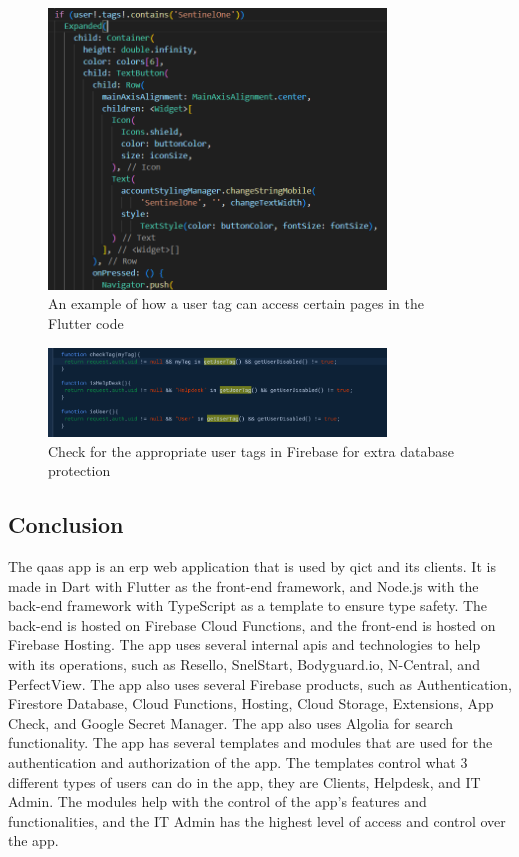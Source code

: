 \begin{figure}[htbp]
      \centering
      \includegraphics[width=0.8\textwidth]{Figures/Qaas App/User tags.png}
      \caption{An example of how a user tag can access certain pages in the Flutter code}
\end{figure}

\begin{figure}[htbp]
      \centering
      \includegraphics[width=0.8\textwidth]{Figures/Qaas App/User Tag Checker.png}
      \caption{Check for the appropriate user tags in Firebase for extra database protection}
\end{figure}


\subsection{Conclusion}
The \acrshort{qaas} app is an \acrshort{erp} web application that is used by \acrshort{qict} and its clients.
It is made in Dart with Flutter as the front-end framework, and Node.js with the back-end  framework with
TypeScript as a template to ensure type safety. The back-end is hosted on Firebase Cloud Functions, and the
front-end is hosted on Firebase Hosting. The app uses several internal \acrshort{api}s and technologies to
help with its operations, such as Resello, SnelStart, Bodyguard.io, N-Central, and PerfectView. The app also
uses several Firebase products, such as Authentication, Firestore Database, Cloud Functions, Hosting, Cloud
Storage, Extensions, App Check, and Google Secret Manager. The app also uses Algolia for search functionality. The app
has several templates and modules that are used for the authentication and authorization of the app.
The templates control what 3 different types of users can do in the app, they are Clients, Helpdesk, and IT
Admin. The modules help with the control of the app's features and functionalities, and the IT Admin has the
highest level of access and control over the app.

